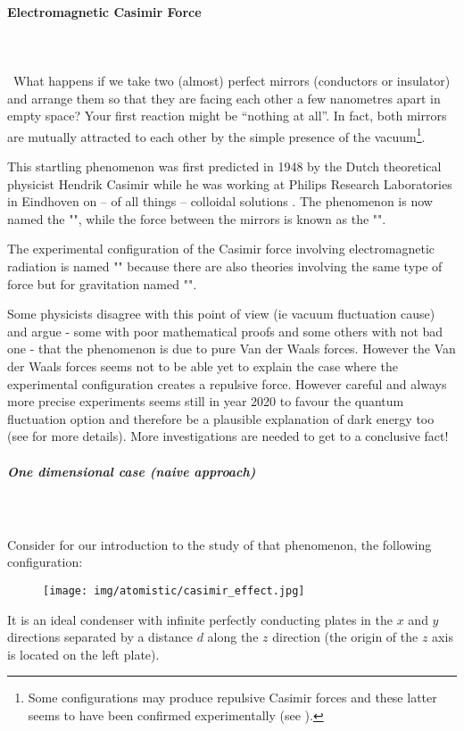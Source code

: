 	 \paragraph{Electromagnetic Casimir Force}\label{electromagnetic Casimir Force}\mbox{}\\\\\
	 What happens if we take two (almost) perfect mirrors (conductors or insulator) and arrange them so that they are facing each other a few nanometres apart in empty space? Your first reaction might be “nothing at all”. In fact, both mirrors are mutually attracted to each other by the simple presence of the vacuum\footnote{Some configurations may produce repulsive Casimir forces and these latter seems to have been confirmed experimentally (see \cite{munday2009measured}).}. 
	 
	 This startling phenomenon was first predicted in 1948 by the Dutch theoretical physicist Hendrik Casimir while he was working at Philips Research Laboratories in Eindhoven on – of all things – colloidal solutions . The phenomenon is now named the "", while the force between the mirrors is known as the "".
	 
	 The experimental configuration of the Casimir force involving electromagnetic radiation is named "" because there are also theories involving the same type of force but for gravitation named "". 
	 
	 \begin{tcolorbox}[title=Remark,colframe=black,arc=10pt]
	Some physicists disagree with this point of view (ie vacuum fluctuation cause) and argue - some with poor mathematical proofs and some others with not bad one - that the phenomenon is due to pure Van der Waals forces. However the Van der Waals forces seems not to be able yet to explain the case where the experimental configuration creates a repulsive force. However careful and always more precise experiments seems still in year 2020 to favour the quantum fluctuation option and therefore be a plausible explanation of dark energy too (see \cite{matsumoto2013casimir} for more details). More investigations are needed to get to a conclusive fact!
	\end{tcolorbox}
	
	\subparagraph{One dimensional case (naive approach)}\mbox{}\\\\
	Consider for our introduction to the study of that phenomenon, the following configuration:
	\begin{figure}[H]
		\centering
		\texttt{[image: img/atomistic/casimir\_effect.jpg]}
	\end{figure}
	It is an ideal condenser with infinite perfectly conducting plates in the $x$ and $y$ directions separated by a distance $d$ along the $z$ direction (the origin of the $z$ axis is located on the left plate).
	

